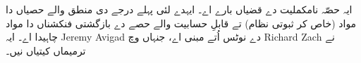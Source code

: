 \documentclass[../../include/open-logic-part]{subfiles}
\begin{document}

\begin{editorial}
 ایہ حصّہ نامکملیت دے قضیاں بارے اے۔ ایہدے لئی پہلے درجے دی
 منطق والے حصیاں دا مواد (خاص کر ثبوتی نظام) تے قابلِ حسابیت والے
 حصے دے بازگشتی فنکشناں دا مواد چاہیدا اے۔ ایہ Jeremy Avigad
 دے نوٹس اُتے مبنی اے، جنہاں وچ Richard Zach نے ترمیماں کیتیاں نیں۔
\end{editorial}






\OLEndPartHook
\end{document}

